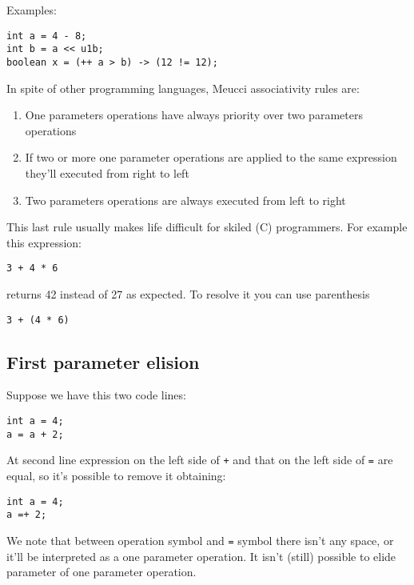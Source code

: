 \documentclass[10pt]{book}%
\newcommand{\code}[1]{\texttt{#1}}
\newenvironment{codeenv}{
\begin{mdframed}[backgroundcolor=black!20,topline=false,leftline=false,rightline=false,bottomline=false]
}
{\end{mdframed}}
\begin{document}
Examples:
\begin{codeenv}
\begin{verbatim}
int a = 4 - 8;
int b = a << u1b;
boolean x = (++ a > b) -> (12 != 12);
\end{verbatim}
\end{codeenv}
In spite of other programming languages, Meucci associativity rules are:
\begin{enumerate}
\item One parameters operations have always priority over two parameters operations
\item If two or more one parameter operations are applied to the same expression they'll executed from right to left
\item Two parameters operations are always executed from left to right
\end{enumerate}
This last rule usually makes life difficult for skiled (C) programmers. For example this expression:
\begin{codeenv}
\begin{verbatim}
3 + 4 * 6
\end{verbatim}
\end{codeenv}
returns 42 instead of 27 as expected. To resolve it you can use parenthesis
\begin{codeenv}
\begin{verbatim}
3 + (4 * 6)
\end{verbatim}
\end{codeenv}

\subsection*{First parameter elision}
Suppose we have this two code lines:
\begin{codeenv}
\begin{verbatim}
int a = 4;
a = a + 2;
\end{verbatim}
\end{codeenv}
At second line expression on the left side of \code + and that on the left side of \code = are equal, so it's possible to remove it obtaining:
\begin{codeenv}
\begin{verbatim}
int a = 4;
a =+ 2;
\end{verbatim}
\end{codeenv}
We note that between operation symbol and \code = symbol there isn't any space, or it'll be interpreted as a one parameter operation. It isn't (still) possible to elide parameter of one parameter operation.
\end{document}
